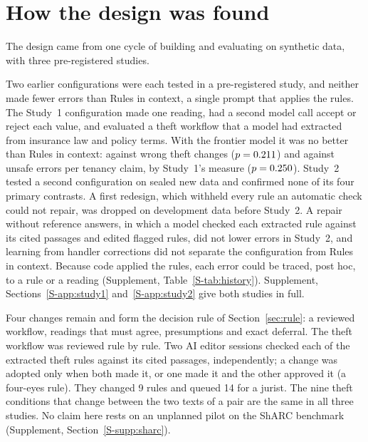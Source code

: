\section{How the design was found}
\label{sec:history}

The design came from one cycle of building and evaluating on synthetic data, with three pre-registered studies.

Two earlier configurations were each tested in a pre-registered study, and neither made fewer errors than Rules in context, a single prompt that applies the rules. The Study~1 configuration made one reading, had a second model call accept or reject each value, and evaluated a theft workflow that a model had extracted from insurance law and policy terms. With the frontier model it was no better than Rules in context: \thTerraCPWrong{} against \thTerraRWrong{} wrong theft changes ($p=0.211$) and \ctTerraHOneA{} against \ctTerraHOneB{} unsafe errors per tenancy claim, by Study~1's measure ($p=0.250$). Study~2 tested a second configuration on sealed new data and confirmed none of its four primary contrasts. A first redesign, which withheld every rule an automatic check could not repair, was dropped on development data before Study~2. A repair without reference answers, in which a model checked each extracted rule against its cited passages and edited flagged rules, did not lower errors in Study~2, and learning from handler corrections did not separate the configuration from Rules in context. Because code applied the rules, each error could be traced, post hoc, to a rule or a reading (Supplement, Table~\ref{S-tab:history}). Supplement, Sections~\ref{S-app:study1} and~\ref{S-app:study2} give both studies in full.

Four changes remain and form the decision rule of Section~\ref{sec:rule}: a reviewed workflow, readings that must agree, presumptions and exact deferral. The theft workflow was reviewed rule by rule. Two AI editor sessions checked each of the \rvRules{} extracted theft rules against its cited passages, independently; a change was adopted only when both made it, or one made it and the other approved it (a four-eyes rule). They changed 9 rules and queued 14 for a jurist. The nine theft conditions that change between the two texts of a pair are the same in all three studies. No claim here rests on an unplanned pilot on the ShARC benchmark \cite{saeidi2018sharc} (Supplement, Section~\ref{S-supp:sharc}).
